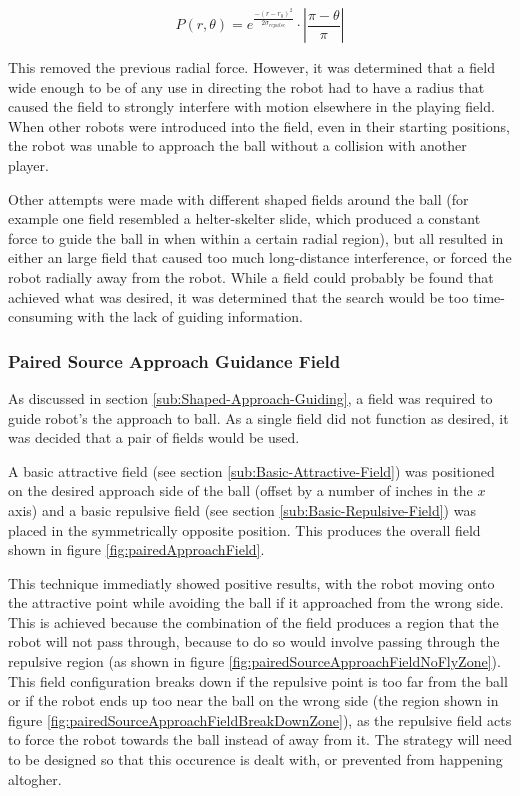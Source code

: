 \documentclass[10pt]{article} \usepackage[a4paper]{geometry}
\begin{document}
\begin{equation}
P\left(r,\theta\right)=e^{\frac{-\left(r-r_{0}\right)^{2}}{2\sigma_{repulse}}}\cdot\left|\frac{\pi-\theta}{\pi}\right|\label{eq:insetWrappedGaussian}
\end{equation}

This removed the previous radial force. However, it was determined that a field
wide enough to be of any use in directing the robot had to have a radius that
caused the field to strongly interfere with motion elsewhere in the playing
field. When other robots were introduced into the field, even in their starting
positions, the robot was unable to approach the ball without a collision with
another player.

Other attempts were made with different shaped fields around the ball (for
example one field resembled a helter-skelter slide, which produced a constant
force to guide the ball in when within a certain radial region), but all
resulted in either an large field that caused too much long-distance
interference, or forced the robot radially away from the robot. While a field
could probably be found that achieved what was desired, it was determined that
the search would be too time-consuming with the lack of guiding information.

\subsubsection{Paired Source Approach Guidance Field}

As discussed in section \ref{sub:Shaped-Approach-Guiding}, a field was required
to guide robot's the approach to ball. As a single field did not function as
desired, it was decided that a pair of fields would be used.

A basic attractive field (see section \ref{sub:Basic-Attractive-Field}) was
positioned on the desired approach side of the ball (offset by a number of
inches in the $x$ axis) and a basic repulsive field (see section
\ref{sub:Basic-Repulsive-Field}) was placed in the symmetrically opposite
position. This produces the overall field shown in figure
\ref{fig:pairedApproachField}.

This technique immediatly showed positive results, with the robot moving onto
the attractive point while avoiding the ball if it approached from the wrong
side. This is achieved because the combination of the field produces a region
that the robot will not pass through, because to do so would involve passing
through the repulsive region (as shown in figure
\ref{fig:pairedSourceApproachFieldNoFlyZone}).  This field configuration breaks
down if the repulsive point is too far from the ball or if the robot ends up too
near the ball on the wrong side (the region shown in figure
\ref{fig:pairedSourceApproachFieldBreakDownZone}), as the repulsive field acts
to force the robot towards the ball instead of away from it.  The strategy will
need to be designed so that this occurence is dealt with, or prevented from
happening altogher.
\end{document}

